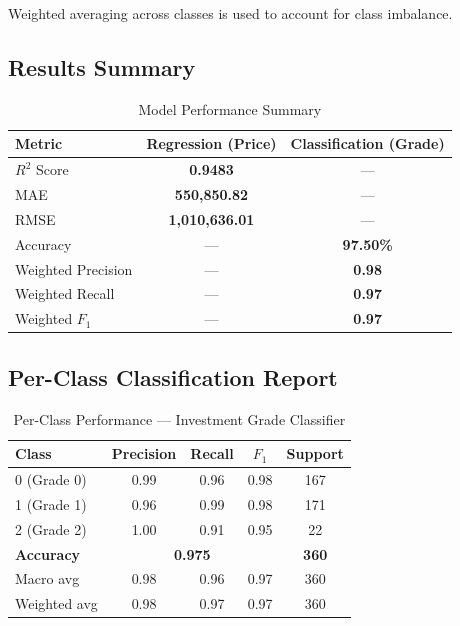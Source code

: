 \documentclass[12pt,a4paper]{article}
\begin{document}
Weighted averaging across classes is used to account for class imbalance.

\subsection{Results Summary}

\begin{table}[H]
\centering
\caption{Model Performance Summary}
\begin{tabular}{@{} l c c @{}}
\toprule
\textbf{Metric} & \textbf{Regression (Price)} & \textbf{Classification (Grade)} \\
\midrule
$R^2$ Score        & \textbf{0.9483}       & ---              \\
MAE                & \textbf{550,850.82}   & ---              \\
RMSE               & \textbf{1,010,636.01} & ---              \\
Accuracy           & ---                   & \textbf{97.50\%} \\
Weighted Precision & ---                   & \textbf{0.98}    \\
Weighted Recall    & ---                   & \textbf{0.97}    \\
Weighted $F_1$     & ---                   & \textbf{0.97}    \\
\bottomrule
\end{tabular}
\end{table}

\subsection{Per-Class Classification Report}

\begin{table}[H]
\centering
\caption{Per-Class Performance --- Investment Grade Classifier}
\begin{tabular}{@{} l c c c c @{}}
\toprule
\textbf{Class} & \textbf{Precision} & \textbf{Recall} & \textbf{$F_1$} & \textbf{Support} \\
\midrule
0 (Grade 0) & 0.99 & 0.96 & 0.98 & 167 \\
1 (Grade 1) & 0.96 & 0.99 & 0.98 & 171 \\
2 (Grade 2) & 1.00 & 0.91 & 0.95 &  22 \\
\midrule
\textbf{Accuracy}    & \multicolumn{3}{c}{\textbf{0.975}} & \textbf{360} \\
Macro avg            & 0.98 & 0.96 & 0.97 & 360 \\
Weighted avg         & 0.98 & 0.97 & 0.97 & 360 \\
\bottomrule
\end{tabular}
\end{table}
\end{document}
